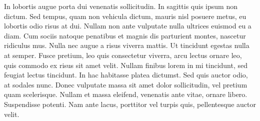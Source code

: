 In lobortis augue porta dui venenatis sollicitudin. In sagittis quis ipsum non dictum. Sed tempus, quam non vehicula dictum, mauris nisl posuere metus, eu lobortis odio risus at dui. Nullam non ante vulputate nulla ultrices euismod eu a diam. Cum sociis natoque penatibus et magnis dis parturient montes, nascetur ridiculus mus. Nulla nec augue a risus viverra mattis. Ut tincidunt egestas nulla at semper. Fusce pretium, leo quis consectetur viverra, arcu lectus ornare leo, quis commodo ex risus sit amet velit. Nullam finibus lorem in mi tincidunt, sed feugiat lectus tincidunt. In hac habitasse platea dictumst. Sed quis auctor odio, at sodales nunc. Donec vulputate massa sit amet dolor sollicitudin, vel pretium quam scelerisque. Nullam et massa eleifend, venenatis ante vitae, ornare libero. Suspendisse potenti. Nam ante lacus, porttitor vel turpis quis, pellentesque auctor velit.